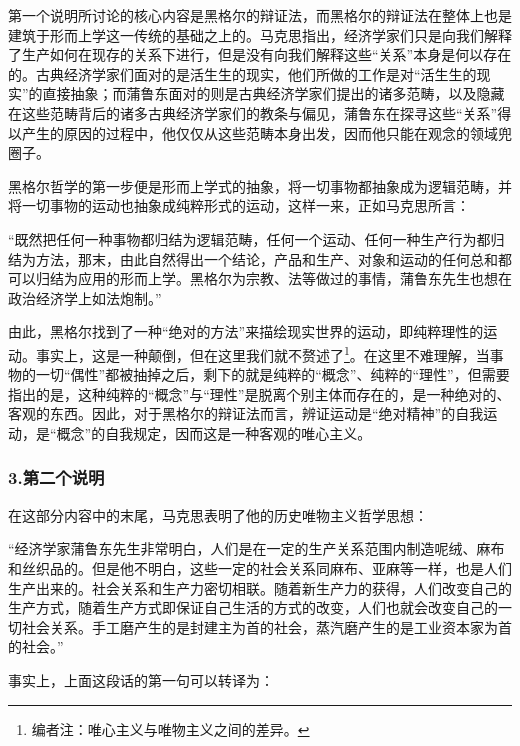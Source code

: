 \documentclass[a4paper,twoside,12pt,AutoFakeBold]{ctexart}
\begin{document}
第一个说明所讨论的核心内容是黑格尔的辩证法，而黑格尔的辩证法在整体上也是建筑于形而上学这一传统的基础之上的。马克思指出，经济学家们只是向我们解释了生产如何在现存的关系下进行，但是没有向我们解释这些“关系”本身是何以存在的。古典经济学家们面对的是活生生的现实，他们所做的工作是对“活生生的现实”的直接抽象；而蒲鲁东面对的则是古典经济学家们提出的诸多范畴，以及隐藏在这些范畴背后的诸多古典经济学家们的教条与偏见，蒲鲁东在探寻这些“关系”得以产生的原因的过程中，他仅仅从这些范畴本身出发，因而他只能在观念的领域兜圈子。

黑格尔哲学的第一步便是形而上学式的抽象，将一切事物都抽象成为逻辑范畴，并将一切事物的运动也抽象成纯粹形式的运动，这样一来，正如马克思所言：

\begin{adjustwidth}{2em}{2em}
    \qquad\fangsong
    “既然把任何一种事物都归结为逻辑范畴，任何一个运动、任何一种生产行为都归结为方法，那末，由此自然得出一个结论，产品和生产、对象和运动的任何总和都可以归结为应用的形而上学。黑格尔为宗教、法等做过的事情，蒲鲁东先生也想在政治经济学上如法炮制。”
\end{adjustwidth}

由此，黑格尔找到了一种“绝对的方法”来描绘现实世界的运动，即纯粹理性的运动。事实上，这是一种颠倒，但在这里我们就不赘述了\footnote{编者注：唯心主义与唯物主义之间的差异。}。在这里不难理解，当事物的一切“偶性”都被抽掉之后，剩下的就是纯粹的“概念”、纯粹的“理性”，但需要指出的是，这种纯粹的“概念”与“理性”是脱离个别主体而存在的，是一种绝对的、客观的东西。因此，对于黑格尔的辩证法而言，辨证运动是“绝对精神”的自我运动，是“概念”的自我规定，因而这是一种客观的唯心主义。


\subsubsection{3.第二个说明}

在这部分内容中的末尾，马克思表明了他的历史唯物主义哲学思想：

\begin{adjustwidth}{2em}{2em}
    \qquad\fangsong
    “经济学家蒲鲁东先生非常明白，人们是在一定的生产关系范围内制造呢绒、麻布和丝织品的。但是他不明白，这些一定的社会关系同麻布、亚麻等一样，也是人们生产出来的。社会关系和生产力密切相联。随着新生产力的获得，人们改变自己的生产方式，随着生产方式即保证自己生活的方式的改变，人们也就会改变自己的一切社会关系。手工磨产生的是封建主为首的社会，蒸汽磨产生的是工业资本家为首的社会。”
\end{adjustwidth}

事实上，上面这段话的第一句可以转译为：
\end{document}
